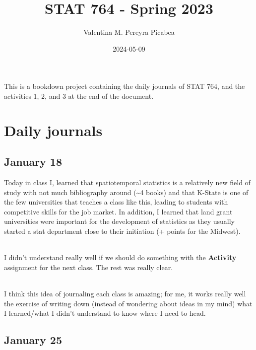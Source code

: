 \documentclass[
]{book}
\title{STAT 764 - Spring 2023}
\author{Valentina M. Pereyra Picabea}
\date{2024-05-09}
\begin{document}
\maketitle

{
\setcounter{tocdepth}{1}
\tableofcontents
}
This is a bookdown project containing the daily journals of STAT 764,
and the activities 1, 2, and 3 at the end of the document.

\hypertarget{daily-journals}{%
\chapter{Daily journals}\label{daily-journals}}

\hypertarget{january-18}{%
\section{January 18}\label{january-18}}

Today in class I, learned that spatiotemporal statistics is a relatively new field of study with not much bibliography around (\textasciitilde4 books) and that K-State is one of the few universities that teaches a class like this, leading to students with competitive skills for the job market. In addition, I learned that land grant universities were important for the development of statistics as they usually started a stat department close to their initiation (+ points for the Midwest).\\
\strut \\
I didn't understand really well if we should do something with the \textbf{Activity} assignment for the next class. The rest was really clear.\\
\strut \\
I think this idea of journaling each class is amazing; for me, it works really well the exercise of writing down (instead of wondering about ideas in my mind) what I learned/what I didn't understand to know where I need to head.

\hypertarget{january-25}{%
\section{January 25}\label{january-25}}
\end{document}
